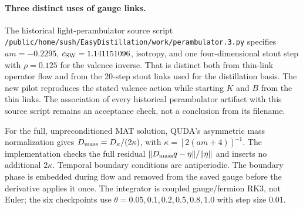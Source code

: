 \documentclass[11pt]{article}
\numberwithin{equation}{section}
\begin{document}
\paragraph{Three distinct uses of gauge links.}
The historical light-perambulator source script
\nolinkurl{/public/home/sush/EasyDistillation/work/perambulator.3.py}
specifies \(am=-0.2295\), \(c_{\rm SW}=1.141151096\), isotropy, and one
four-dimensional stout step with \(\rho=0.125\) for the valence inverse.
That is distinct both from thin-link operator flow and from the 20-step
stout links used for the distillation basis.  The new pilot reproduces the
stated valence action while starting \(K\) and \(B\) from the thin links.
The association of every historical perambulator artifact with this source
script remains an acceptance check, not a conclusion from its filename.

For the full, unpreconditioned MAT solution, QUDA's asymmetric mass
normalization gives \(D_{\rm mass}=D_\kappa/(2\kappa)\), with
\(\kappa=[2(am+4)]^{-1}\).  The implementation checks the full residual
\(\|D_{\rm mass}q-\eta\|/\|\eta\|\) and inserts no additional
\(2\kappa\).  Temporal boundary conditions are antiperiodic.  The boundary
phase is embedded during flow and removed from the saved gauge before the
derivative applies it once.  The integrator is coupled gauge/fermion RK3,
not Euler; the six checkpoints use
\(\theta=0.05,0.1,0.2,0.5,0.8,1.0\) with step size \(0.01\).
\end{document}
